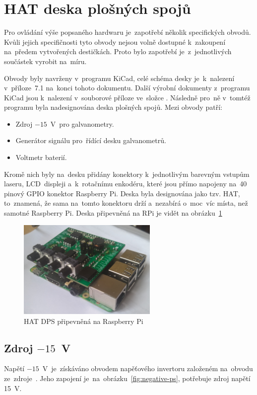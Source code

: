\section{HAT deska plošných spojů}
Pro ovládání výše popsaného hardwaru je~zapotřebí několik specifických obvodů.
Kvůli jejich specifičnosti tyto obvody nejsou volně dostupné k~zakoupení na~předem vytvořených destičkách. Proto bylo zapotřebí je~z~jednotlivých součástek vyrobit na~míru.

Obvody byly navrženy v~programu KiCad, celé schéma desky je~k~nalezení v~příloze~7.1 na~konci tohoto dokumentu. Další výrobní dokumenty z~programu KiCad jsou k~nalezení v~souborové příloze ve~složce . Následně pro~ně v~tomtéž programu byla nadesignována deska plošných spojů. Mezi obvody patří:
\begin{itemize}
  \item Zdroj $-15$~V~pro galvanometry.
  \item Generátor signálu pro~řídící desku galvanometrů.
  \item Voltmetr baterií.
\end{itemize}

Kromě nich byly na~desku přidány konektory k~jednotlivým barevným vstupům laseru, LCD~displeji a~k~rotačnímu enkodéru, které jsou přímo napojeny na~40 pinový GPIO konektor Raspberry Pi.
Deska byla designována jako tzv. HAT, to~znamená, že sama na~tomto konektoru drží a~nezabírá o~moc~víc místa, než samotné Raspberry Pi. Deska připevněná na RPi je vidět na obrázku~\ref{fig:pcb-mounted}

\begin{figure}[htb]
  \centering
  \includegraphics[width=0.6\textwidth]{img/pcb-mounted.jpg}
  \caption{\label{fig:pcb-mounted} HAT DPS připevněná na Raspberry Pi }
\end{figure}

\subsection{Zdroj $-15$~V}\label{sec:negative-ps}
Napětí $-15$~V~je~získáváno obvodem napěťového invertoru založeném na~obvodu ze~zdroje~\cite{ampalyzer}. Jeho zapojení je~na~obrázku~\ref{fig:negative-ps}, potřebuje zdroj napětí 15~V.

